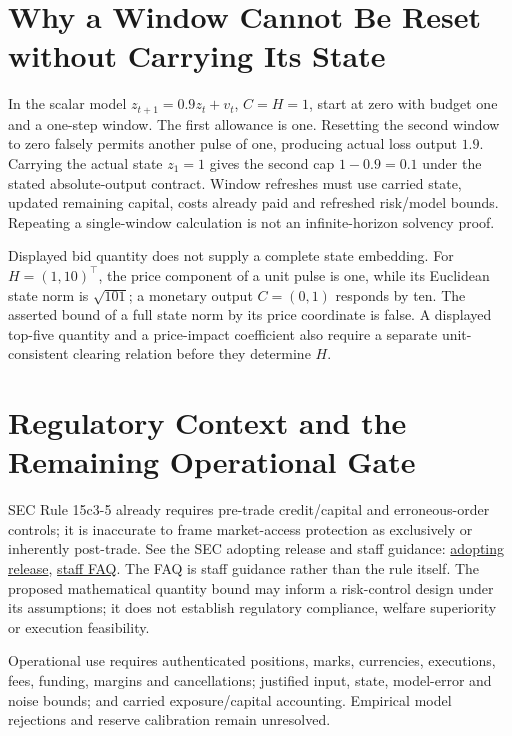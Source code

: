 \section{Why a Window Cannot Be Reset without Carrying Its State}
In the scalar model $z_{t+1}=0.9z_t+v_t$, $C=H=1$, start at zero with budget one and a one-step window. The first allowance is one. Resetting the second window to zero falsely permits another pulse of one, producing actual loss output $1.9$. Carrying the actual state $z_1=1$ gives the second cap $1-0.9=0.1$ under the stated absolute-output contract. Window refreshes must use carried state, updated remaining capital, costs already paid and refreshed risk/model bounds. Repeating a single-window calculation is not an infinite-horizon solvency proof.

Displayed bid quantity does not supply a complete state embedding. For $H=(1,10)^\top$, the price component of a unit pulse is one, while its Euclidean state norm is $\sqrt{101}$; a monetary output $C=(0,1)$ responds by ten. The asserted bound of a full state norm by its price coordinate is false. A displayed top-five quantity and a price-impact coefficient also require a separate unit-consistent clearing relation before they determine $H$.

\section{Regulatory Context and the Remaining Operational Gate}
SEC Rule 15c3-5 already requires pre-trade credit/capital and erroneous-order controls; it is inaccurate to frame market-access protection as exclusively or inherently post-trade. See the SEC adopting release and staff guidance: \href{https://www.sec.gov/rules/final/2010/34-63241.pdf}{adopting release}, \href{https://www.sec.gov/rules-regulations/staff-guidance/trading-markets-frequently-asked-questions/divisionsmarketregfaq-0}{staff FAQ}. The FAQ is staff guidance rather than the rule itself. The proposed mathematical quantity bound may inform a risk-control design under its assumptions; it does not establish regulatory compliance, welfare superiority or execution feasibility.

Operational use requires authenticated positions, marks, currencies, executions, fees, funding, margins and cancellations; justified input, state, model-error and noise bounds; and carried exposure/capital accounting. Empirical model rejections and reserve calibration remain unresolved.

